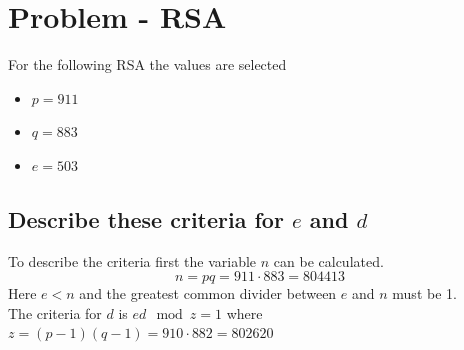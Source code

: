 \documentclass[12pt, a4paper]{article}
\begin{document}
	\section{Problem - RSA}
		For the following RSA the values are selected
		\begin{itemize}
			\item $p=911$
			\item $q=883$
			\item $e=503$
		\end{itemize}
		\subsection{Describe these criteria for $e$ and $d$}
			To describe the criteria first the variable $n$ can be calculated.
			$$n=pq=911\cdot 883=804413$$
			Here $e<n$ and the greatest common divider between $e$ and $n$ must be 1.\\
			The criteria for $d$ is $ed\mod z = 1$ where $z=(p-1)(q-1)=910\cdot 882=802620$
\end{document}
